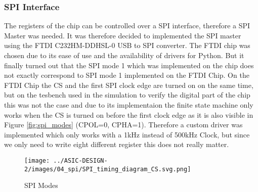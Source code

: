 \subsubsection{SPI Interface}
The registers of the chip can be controlled over a SPI interface, therefore a SPI Master was needed.
It was therefore decided to implemented the SPI master using the FTDI C232HM-DDHSL-0 USB to SPI converter. The FTDI chip was chosen due to its ease of use and the availability of drivers for Python. But it finally turned out that the SPI mode 1 which was implemented on the chip does not exactly correspond to SPI mode 1 implemented on the FTDI Chip. On the FTDI Chip the CS and the first SPI clock edge are turned on on the same time, but on the tesbench used in the simulation to verify the digital part of the chip this was not the case and due to its implementaion the finite state machine only works when the CS is turned on before the first clock edge as it is also visible in Figure \autoref{fig:spi_modes} (CPOL=0, CPHA=1). Therefore a custom driver was implemented which only works with a 1kHz instead of 500kHz Clock, but since we only need to write eight different register this does not really matter.


\begin{figure}[h]
    \centering
    \texttt{[image: ../ASIC-DESIGN-2/images/04\_spi/SPI\_timing\_diagram\_CS.svg.png]}
    \caption{SPI Modes \cite{Wikipedia:SPI}}
    \label{fig:spi_modes}
\end{figure}

